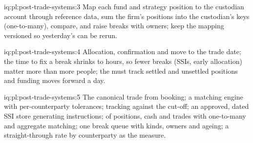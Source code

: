 \begin{solution}{iq:pl:post-trade-systems:3}
Map each fund and strategy position to the custodian account through reference data, sum the firm's positions into the custodian's keys
(one-to-many), compare, and raise breaks with owners; keep the mapping versioned so yesterday's  can be rerun.
\end{solution}

\begin{solution}{iq:pl:post-trade-systems:4}
Allocation, confirmation and  move to the trade date; the time to fix a break shrinks to hours, so fewer breaks (SSIs, early
allocation) matter more than more people; the  must track settled and unsettled positions and funding moves forward a day.
\end{solution}

\begin{solution}{iq:pl:post-trade-systems:5}
The canonical trade from booking; a matching engine with per-counterparty tolerances;  tracking against the cut-off; an approved,
dated SSI store generating instructions;  of positions, cash and trades with one-to-many and aggregate matching; one break queue
with kinds, owners and ageing; a straight-through rate by counterparty as the measure.
\end{solution}
